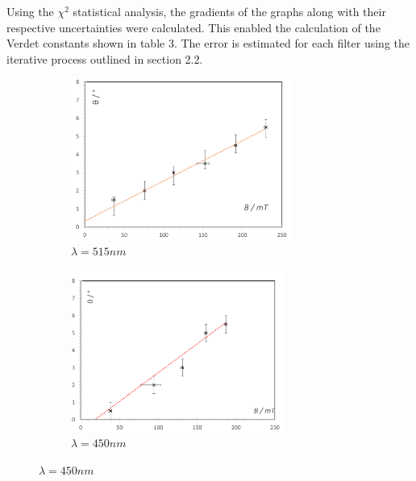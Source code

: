 \documentclass{article}%
\begin{document}
Using the $\chi^{2}$ statistical analysis, the gradients of the graphs along with their respective uncertainties were calculated. This enabled the calculation of the Verdet constants shown in table 3. The error is estimated for each filter using the iterative process outlined in section 2.2.

\begin{figure}[H]
    \begin{subfigure}{0.475\textwidth}
        \includegraphics[width=\textwidth, height=200px]{green.png}
        \caption{$\lambda = 515nm$}
        \label{fig:first}
    \end{subfigure}
    \hfill
    \begin{subfigure}{0.475\textwidth}
        \includegraphics[width=\textwidth, height=200px]{yellow.png}
        \caption{$\lambda = 450nm$}
        \label{fig:second}
    \end{subfigure}
    \hfill
    

\end{figure}
\end{document}
